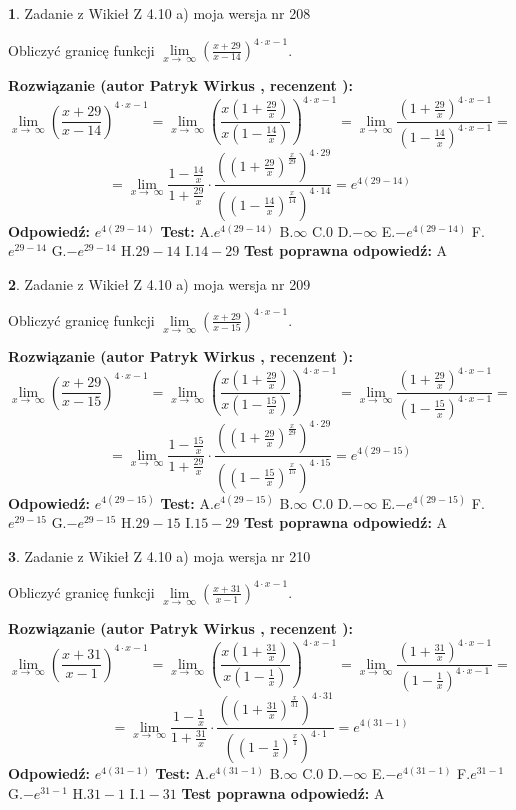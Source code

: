 \documentclass[12pt, a4paper]{article}
\theoremstyle{definition} %
\newtheorem{zad}{}
\newcommand{\zadStart}[1]{\begin{zad}#1\newline}
\newcommand{\zadStop}{\end{zad}}
\newcommand{\rozwStart}[2]{\noindent \textbf{Rozwiązanie (autor #1 , recenzent #2): }\newline}
\newcommand{\rozwStop}{\newline}
\newcommand{\odpStart}{\noindent \textbf{Odpowiedź:}\newline}
\newcommand{\odpStop}{\newline}
\newcommand{\testStart}{\noindent \textbf{Test:}\newline}
\newcommand{\testStop}{\newline}
\newcommand{\kluczStart}{\noindent \textbf{Test poprawna odpowiedź:}\newline}
\newcommand{\kluczStop}{\newline}
\begin{document}
\zadStart{Zadanie z Wikieł Z 4.10 a) moja wersja nr 208}


Obliczyć granicę funkcji  $\lim\limits_{x\to\ \infty}(\frac{x+29}{x-14})^{4\cdot x-1}$.
\zadStop
\rozwStart{Patryk Wirkus}{}
$$\lim\limits_{x\to\ \infty}(\frac{x+29}{x-14})^{4\cdot x-1} = \lim\limits_{x\to\ \infty}(\frac{x(1+\frac{29}{x})}{x(1-\frac{14}{x})})^{4\cdot x-1}=\lim\limits_{x\to\ \infty}\frac{(1+\frac{29}{x})^{4\cdot x-1}}{(1-\frac{14}{x})^{4\cdot x-1}}=$$
$$=\lim\limits_{x\to\ \infty}\frac{1-\frac{14}{x}}{1+\frac{29}{x}}\cdot\frac{((1+\frac{29}{x})^{\frac{x}{29}})^{4\cdot29}}{((1-\frac{14}{x})^{\frac{x}{14}})^{4\cdot14}}=e^{4(29-14)}$$
\rozwStop
\odpStart
$e^{4(29-14)}$
\odpStop
\testStart
A.$e^{4(29-14)}$ B.$\infty$ C.$0$ D.$-\infty$ E.$-e^{4(29-14)}$
F.$e^{29-14}$ G.$-e^{29-14}$
H.$29-14$
I.$14-29$
\testStop
\kluczStart
A
\kluczStop



\zadStart{Zadanie z Wikieł Z 4.10 a) moja wersja nr 209}


Obliczyć granicę funkcji  $\lim\limits_{x\to\ \infty}(\frac{x+29}{x-15})^{4\cdot x-1}$.
\zadStop
\rozwStart{Patryk Wirkus}{}
$$\lim\limits_{x\to\ \infty}(\frac{x+29}{x-15})^{4\cdot x-1} = \lim\limits_{x\to\ \infty}(\frac{x(1+\frac{29}{x})}{x(1-\frac{15}{x})})^{4\cdot x-1}=\lim\limits_{x\to\ \infty}\frac{(1+\frac{29}{x})^{4\cdot x-1}}{(1-\frac{15}{x})^{4\cdot x-1}}=$$
$$=\lim\limits_{x\to\ \infty}\frac{1-\frac{15}{x}}{1+\frac{29}{x}}\cdot\frac{((1+\frac{29}{x})^{\frac{x}{29}})^{4\cdot29}}{((1-\frac{15}{x})^{\frac{x}{15}})^{4\cdot15}}=e^{4(29-15)}$$
\rozwStop
\odpStart
$e^{4(29-15)}$
\odpStop
\testStart
A.$e^{4(29-15)}$ B.$\infty$ C.$0$ D.$-\infty$ E.$-e^{4(29-15)}$
F.$e^{29-15}$ G.$-e^{29-15}$
H.$29-15$
I.$15-29$
\testStop
\kluczStart
A
\kluczStop



\zadStart{Zadanie z Wikieł Z 4.10 a) moja wersja nr 210}


Obliczyć granicę funkcji  $\lim\limits_{x\to\ \infty}(\frac{x+31}{x-1})^{4\cdot x-1}$.
\zadStop
\rozwStart{Patryk Wirkus}{}
$$\lim\limits_{x\to\ \infty}(\frac{x+31}{x-1})^{4\cdot x-1} = \lim\limits_{x\to\ \infty}(\frac{x(1+\frac{31}{x})}{x(1-\frac{1}{x})})^{4\cdot x-1}=\lim\limits_{x\to\ \infty}\frac{(1+\frac{31}{x})^{4\cdot x-1}}{(1-\frac{1}{x})^{4\cdot x-1}}=$$
$$=\lim\limits_{x\to\ \infty}\frac{1-\frac{1}{x}}{1+\frac{31}{x}}\cdot\frac{((1+\frac{31}{x})^{\frac{x}{31}})^{4\cdot31}}{((1-\frac{1}{x})^{\frac{x}{1}})^{4\cdot1}}=e^{4(31-1)}$$
\rozwStop
\odpStart
$e^{4(31-1)}$
\odpStop
\testStart
A.$e^{4(31-1)}$ B.$\infty$ C.$0$ D.$-\infty$ E.$-e^{4(31-1)}$
F.$e^{31-1}$ G.$-e^{31-1}$
H.$31-1$
I.$1-31$
\testStop
\kluczStart
A
\kluczStop
\end{document}
